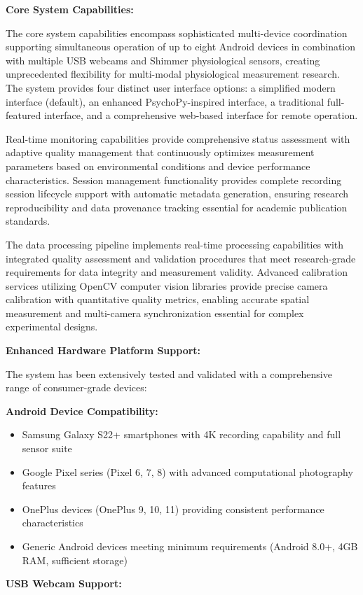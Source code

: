 \documentclass[12pt,a4paper]{article}
\begin{document}
\textbf{Core System Capabilities:}

The core system capabilities encompass sophisticated multi-device coordination supporting simultaneous operation of up
to eight Android devices in combination with multiple USB webcams and Shimmer physiological sensors, creating
unprecedented flexibility for multi-modal physiological measurement research. The system provides four distinct user
interface options: a simplified modern interface (default), an enhanced PsychoPy-inspired interface, a traditional
full-featured interface, and a comprehensive web-based interface for remote operation.

Real-time monitoring capabilities provide comprehensive status assessment with adaptive quality management that
continuously optimizes measurement parameters based on environmental conditions and device performance characteristics.
Session management functionality provides complete recording session lifecycle support with automatic metadata
generation, ensuring research reproducibility and data provenance tracking essential for academic publication standards.

The data processing pipeline implements real-time processing capabilities with integrated quality assessment and
validation procedures that meet research-grade requirements for data integrity and measurement validity. Advanced
calibration services utilizing OpenCV computer vision libraries provide precise camera calibration with quantitative
quality metrics, enabling accurate spatial measurement and multi-camera synchronization essential for complex
experimental designs.

\textbf{Enhanced Hardware Platform Support:}

The system has been extensively tested and validated with a comprehensive range of consumer-grade devices:

\textbf{Android Device Compatibility:}

\begin{itemize}
\item Samsung Galaxy S22+ smartphones with 4K recording capability and full sensor suite
\item Google Pixel series (Pixel 6, 7, 8) with advanced computational photography features
\item OnePlus devices (OnePlus 9, 10, 11) providing consistent performance characteristics
\item Generic Android devices meeting minimum requirements (Android 8.0+, 4GB RAM, sufficient storage)

\end{itemize}
\textbf{USB Webcam Support:}
\end{document}
